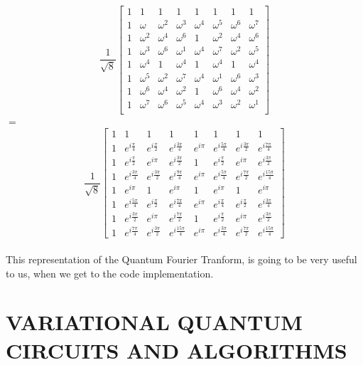 \documentclass[inscr,ack,preface]{diphdthesis}
\begin{document}
\[
\frac{1}{\sqrt{8}}
\begin{bmatrix}
1 & 1 & 1 & 1 & 1 & 1 & 1 & 1 \\
1 & \omega & \omega^2 & \omega^3 & \omega^4 & \omega^5 & \omega^6 & \omega^7 \\
1 & \omega^2 & \omega^4 & \omega^6 & 1 & \omega^2 & \omega^4 & \omega^6 \\
1 & \omega^3 & \omega^6 & \omega^1 & \omega^4 & \omega^7 & \omega^2 & \omega^5 \\
1 & \omega^4 & 1 & \omega^4 & 1 & \omega^4 & 1 & \omega^4 \\
1 & \omega^5 & \omega^2 & \omega^7 & \omega^4 & \omega^1 & \omega^6 & \omega^3 \\
1 & \omega^6 & \omega^4 & \omega^2 & 1 & \omega^6 & \omega^4 & \omega^2 \\
1 & \omega^7 & \omega^6 & \omega^5 & \omega^4 & \omega^3 & \omega^2 & \omega^1 \\
\end{bmatrix}
\]
$=$\[
\frac{1}{\sqrt{8}} \begin{bmatrix}
1 & 1 & 1 & 1 & 1 & 1 & 1 & 1 \\
1 & e^{i\frac{\pi}{4}} & e^{i\frac{\pi}{2}} & e^{i\frac{3\pi}{4}} & e^{i\pi} & e^{i\frac{5\pi}{4}} & e^{i\frac{3\pi}{2}} & e^{i\frac{7\pi}{4}} \\
1 & e^{i\frac{\pi}{2}} & e^{i\pi} & e^{i\frac{3\pi}{2}} & 1 & e^{i\frac{\pi}{2}} & e^{i\pi} & e^{i\frac{3\pi}{2}} \\
1 & e^{i\frac{3\pi}{4}} & e^{i\frac{3\pi}{2}} & e^{i\frac{9\pi}{4}} & e^{i\pi} & e^{i\frac{5\pi}{4}} & e^{i\frac{7\pi}{2}} & e^{i\frac{15\pi}{4}} \\
1 & e^{i\pi} & 1 & e^{i\pi} & 1 & e^{i\pi} & 1 & e^{i\pi} \\
1 & e^{i\frac{5\pi}{4}} & e^{i\frac{\pi}{2}} & e^{i\frac{7\pi}{4}} & e^{i\pi} & e^{i\frac{\pi}{4}} & e^{i\frac{\pi}{2}} & e^{i\frac{3\pi}{4}} \\
1 & e^{i\frac{3\pi}{2}} & e^{i\pi} & e^{i\frac{7\pi}{2}} & 1 & e^{i\frac{\pi}{2}} & e^{i\pi} & e^{i\frac{3\pi}{2}} \\
1 & e^{i\frac{7\pi}{4}} & e^{i\frac{3\pi}{2}} & e^{i\frac{15\pi}{4}} & e^{i\pi} & e^{i\frac{3\pi}{4}} & e^{i\frac{7\pi}{2}} & e^{i\frac{15\pi}{4}}
\end{bmatrix}
\]
\normalsize 
\\This representation of the Quantum Fourier Tranform, is going to be very useful to us, when we get to the code implementation.

\chapter{VARIATIONAL QUANTUM CIRCUITS AND ALGORITHMS}
\end{document}
